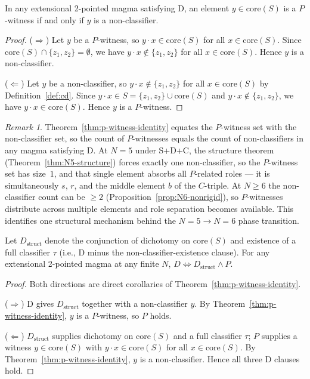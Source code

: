 \documentclass[sigconf,screen]{acmart}
\newcommand{\dotop}{\cdot}
\newcommand{\core}{\mathrm{core}}
\theoremstyle{remark}
\newtheorem{remark}{Remark}
\begin{document}
\begin{theorem}
\label{thm:p-witness-identity}
In any extensional 2-pointed magma satisfying D, an element $y \in \core(S)$ is a $P$-witness if and only if $y$ is a non-classifier.
\end{theorem}

\begin{proof}
($\Rightarrow$) Let $y$ be a $P$-witness, so $y \dotop x \in \core(S)$ for all $x \in \core(S)$. Since $\core(S) \cap \{z_1, z_2\} = \emptyset$, we have $y \dotop x \notin \{z_1, z_2\}$ for all $x \in \core(S)$. Hence $y$ is a non-classifier.

($\Leftarrow$) Let $y$ be a non-classifier, so $y \dotop x \notin \{z_1, z_2\}$ for all $x \in \core(S)$ by Definition~\ref{def:cd}. Since $y \dotop x \in S = \{z_1, z_2\} \cup \core(S)$ and $y \dotop x \notin \{z_1, z_2\}$, we have $y \dotop x \in \core(S)$. Hence $y$ is a $P$-witness.
\end{proof}

\begin{remark}
Theorem~\ref{thm:p-witness-identity} equates the $P$-witness set with the non-classifier set, so the count of $P$-witnesses equals the count of non-classifiers in any magma satisfying D. At $N=5$ under S+D+C, the structure theorem (Theorem~\ref{thm:N5-structure}) forces exactly one non-classifier, so the $P$-witness set has size~$1$, and that single element absorbs all $P$-related roles --- it is simultaneously $s$, $r$, and the middle element $b$ of the $C$-triple. At $N \geq 6$ the non-classifier count can be $\geq 2$ (Proposition~\ref{prop:N6-nonrigid}), so $P$-witnesses distribute across multiple elements and role separation becomes available. This identifies one structural mechanism behind the $N=5 \to N=6$ phase transition.
\end{remark}

\begin{theorem}
\label{thm:d-factorization}
Let $D_{\mathrm{struct}}$ denote the conjunction of dichotomy on $\core(S)$ and existence of a full classifier $\tau$ (i.e., D minus the non-classifier-existence clause). For any extensional 2-pointed magma at any finite $N$, $D \iff D_{\mathrm{struct}} \wedge P$.
\end{theorem}

\begin{proof}
Both directions are direct corollaries of Theorem~\ref{thm:p-witness-identity}.

($\Rightarrow$) D gives $D_{\mathrm{struct}}$ together with a non-classifier $y$. By Theorem~\ref{thm:p-witness-identity}, $y$ is a $P$-witness, so $P$ holds.

($\Leftarrow$) $D_{\mathrm{struct}}$ supplies dichotomy on $\core(S)$ and a full classifier $\tau$; $P$ supplies a witness $y \in \core(S)$ with $y \dotop x \in \core(S)$ for all $x \in \core(S)$. By Theorem~\ref{thm:p-witness-identity}, $y$ is a non-classifier. Hence all three D clauses hold.
\end{proof}
\end{document}
